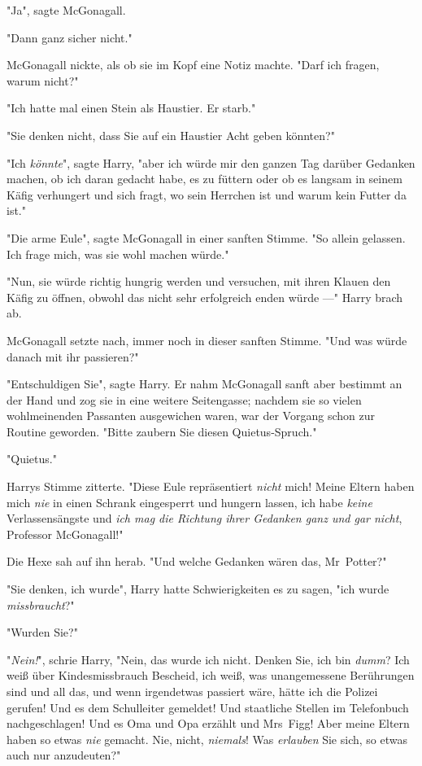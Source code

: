 {"Ja", sagte McGonagall.

"Dann ganz sicher nicht."

McGonagall nickte, als ob sie im Kopf eine Notiz machte. "Darf ich fragen, warum nicht?"

"Ich hatte mal einen Stein als Haustier. Er starb."

"Sie denken nicht, dass Sie auf ein Haustier Acht geben könnten?"

"Ich \emph{könnte}", sagte Harry, "aber ich würde mir den ganzen Tag darüber Gedanken machen, ob ich daran gedacht habe, es zu füttern oder ob es langsam in seinem Käfig verhungert und sich fragt, wo sein Herrchen ist und warum kein Futter da ist."

"Die arme Eule", sagte McGonagall in einer sanften Stimme. "So allein gelassen. Ich frage mich, was sie wohl machen würde."

"Nun, sie würde richtig hungrig werden und versuchen, mit ihren Klauen den Käfig zu öffnen, obwohl das nicht sehr erfolgreich enden würde ---" Harry brach ab.

McGonagall setzte nach, immer noch in dieser sanften Stimme. "Und was würde danach mit ihr passieren?"

"Entschuldigen Sie", sagte Harry. Er nahm McGonagall sanft aber bestimmt an der Hand und zog sie in eine weitere Seitengasse; nachdem sie so vielen wohlmeinenden Passanten ausgewichen waren, war der Vorgang schon zur Routine geworden. "Bitte zaubern Sie diesen Quietus-Spruch."

"Quietus."

Harrys Stimme zitterte. "Diese Eule repräsentiert \emph{nicht} mich! Meine Eltern haben mich \emph{nie} in einen Schrank eingesperrt und hungern lassen, ich habe \emph{keine} Verlassensängste und \emph{ich mag die Richtung ihrer Gedanken ganz und gar nicht}, Professor McGonagall!"

Die Hexe sah auf ihn herab. "Und welche Gedanken wären das, Mr~Potter?"

"Sie denken, ich wurde", Harry hatte Schwierigkeiten es zu sagen, "ich wurde \emph{missbraucht}?"

"Wurden Sie?"

"\emph{Nein!}", schrie Harry, "Nein, das wurde ich nicht. Denken Sie, ich bin \emph{dumm}? Ich weiß über Kindesmissbrauch Bescheid, ich weiß, was unangemessene Berührungen sind und all das, und wenn irgendetwas passiert wäre, hätte ich die Polizei gerufen! Und es dem Schulleiter gemeldet! Und staatliche Stellen im Telefonbuch nachgeschlagen! Und es Oma und Opa erzählt und Mrs~Figg! Aber meine Eltern haben so etwas \emph{nie} gemacht. Nie, nicht, \emph{niemals}! Was \emph{erlauben} Sie sich, so etwas auch nur anzudeuten?"

}
